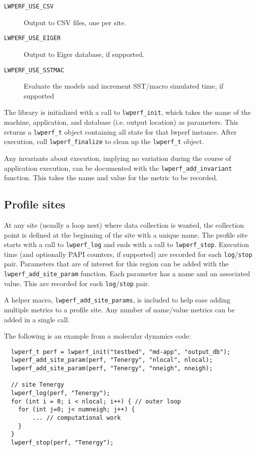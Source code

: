 \documentclass{article}
\begin{document}
\begin{description}
    \item[\texttt{LWPERF\_USE\_CSV}] Output to CSV files, one per site.
    \item[\texttt{LWPERF\_USE\_EIGER}] Output to Eiger database, if supported.
    \item[\texttt{LWPERF\_USE\_SSTMAC}] Evaluate the models and increment SST/macro simulated time, if supported
\end{description}

The library is initialized with a call to \texttt{lwperf\_init}, which takes the name of the machine, application, and database (i.e. output location) as parameters. This returns a \texttt{lwperf\_t} object containing all state for that lwperf instance. After execution, call \texttt{lwperf\_finalize} to clean up the \texttt{lwperf\_t} object.

Any invariants about execution, implying no variation during the course of application execution, can be documented with the \texttt{lwperf\_add\_invariant} function. This takes the name and value for the metric to be recorded.

\subsection{Profile sites}
At any site (usually a loop nest) where data collection is wanted, the collection point is defined at the beginning of the site with a unique name. The profile site starts with a call to \texttt{lwperf\_log} and ends with a call to \texttt{lwperf\_stop}. Execution time (and optionally PAPI counters, if supported) are recorded for each \texttt{log}/\texttt{stop} pair. Parameters that are of interest for this region can be added with the \texttt{lwperf\_add\_site\_param} function. Each parameter has a name and an associated value. This are recorded for each \texttt{log}/\texttt{stop} pair.

A helper macro, \texttt{lwperf\_add\_site\_params}, is included to help ease adding multiple metrics to a profile site. Any number of name/value metrics can be added in a single call.

The following is an example from a molecular dynamics code:
\begin{verbatim}
  lwperf_t perf = lwperf_init("testbed", "md-app", "output_db");
  lwperf_add_site_param(perf, "Tenergy", "nlocal", nlocal);
  lwperf_add_site_param(perf, "Tenergy", "nneigh", nneigh);

  // site Tenergy
  lwperf_log(perf, "Tenergy");
  for (int i = 0; i < nlocal; i++) { // outer loop
    for (int j=0; j< numneigh; j++) {
        ... // computational work
    }
  }
  lwperf_stop(perf, "Tenergy");
\end{verbatim}
\end{document}
